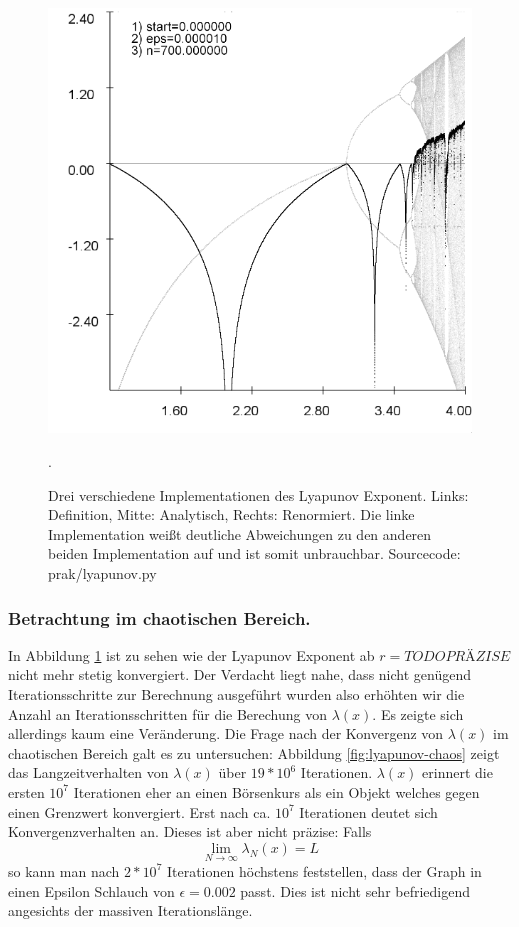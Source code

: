 \documentclass{scrartcl}
\begin{document}
\begin{figure}[!htbp]
\includegraphics[scale=0.28]{iteration/lyapunov-3}
\caption{Drei verschiedene Implementationen des Lyapunov Exponent. Links: Definition, Mitte: Analytisch, Rechts: Renormiert. Die linke Implementation weißt deutliche Abweichungen zu den anderen beiden Implementation auf und ist somit unbrauchbar. Sourcecode: prak/lyapunov.py}. 
\label{fig:lyapunov}
\end{figure}
 
\subsubsection{Betrachtung im chaotischen Bereich.}
In Abbildung \ref{fig:lyapunov} ist zu sehen wie der Lyapunov Exponent ab $r=TODO PRÄZISE$ nicht mehr stetig konvergiert. 
Der Verdacht liegt nahe, dass nicht genügend Iterationsschritte zur Berechnung ausgeführt wurden also erhöhten wir die Anzahl an Iterationsschritten für die Berechung von $\lambda(x)$. Es zeigte sich allerdings kaum eine Veränderung. Die Frage nach der Konvergenz von $\lambda(x)$ im chaotischen Bereich galt es zu untersuchen: Abbildung \ref{fig:lyapunov-chaos} zeigt das Langzeitverhalten von $\lambda(x)$ über $19*10^6$ Iterationen. $\lambda(x)$ erinnert die ersten $10^7$ Iterationen eher an einen Börsenkurs als ein Objekt welches gegen einen Grenzwert konvergiert. Erst nach ca. $10^7$ Iterationen deutet sich Konvergenzverhalten an. Dieses ist aber nicht präzise: Falls 
\begin{equation}
\lim_{N \rightarrow \infty} \lambda_N(x) = L
\end{equation}
so kann man nach $2*10^7$ Iterationen höchstens feststellen, dass der Graph in einen Epsilon Schlauch von $\epsilon=0.002$ passt. Dies ist nicht sehr befriedigend angesichts der massiven Iterationslänge.  
 
\end{document}
